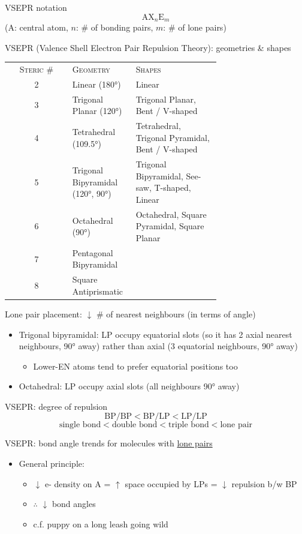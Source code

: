\documentclass[10pt,landscape]{article}
\newcommand{\extraline}{\vspace{1em}}
\newcommand{\tableindent}{\hspace{1.5em}}
\begin{document}
\begin{multicols}{3}
VSEPR notation
\[ \text{AX}_n\text{E}_m \]
\tableindent (A: central atom, $n$: \# of bonding pairs, $m$: \# of lone pairs) \\
\extraline


VSEPR (Valence Shell Electron Pair Repulsion Theory): geometries \& shapes

\begin{tabular}{@{\tableindent}cp{0.3\linewidth}<{\raggedright}p{0.4\linewidth}<{\raggedright}@{}}
\textsc{Steric \#} & \textsc{Geometry} & \textsc{Shapes} \\ 
2 & Linear (180°) 
	& Linear \\
3 & Trigonal Planar (120°)
	& Trigonal Planar, Bent / V-shaped \\
4 & Tetrahedral (109.5°)
	& Tetrahedral, Trigonal Pyramidal, Bent / V-shaped  \\
5 & Trigonal Bipyramidal (120°, 90°)
	& Trigonal Bipyramidal, See-saw, T-shaped, Linear  \\
6 & Octahedral (90°)
	& Octahedral, Square Pyramidal, Square Planar \\
7 & Pentagonal Bipyramidal & \\ %
8 & Square Antiprismatic & \\ %
\end{tabular}
\extraline

Lone pair placement:  $\downarrow$ \# of nearest neighbours (in terms of angle)
\begin{itemize}
	\item Trigonal bipyramidal: LP occupy equatorial slots (so it has 2 axial nearest neighbours, 90° away) rather than axial (3 equatorial neighbours, 90° away)
	\begin{itemize}	
		\item Lower-EN atoms tend to prefer equatorial positions too
	\end{itemize}
	\item Octahedral: LP occupy axial slots (all neighbours 90° away)
\end{itemize}


VSEPR: degree of repulsion
\[ \text{BP/BP} < \text{BP/LP} < \text{LP/LP} \]
\[ \text{single bond} < \text{double bond} < \text{triple bond} < \text{lone pair} \]

VSEPR: bond angle trends for molecules with \underline{lone pairs}
\begin{itemize}
\item General principle: 
	\begin{itemize}
		\item  $\downarrow$ e- density on A = $\uparrow$ space occupied by LPs = $\downarrow$ repulsion b/w BP 
		\item $\therefore$ $\downarrow$ bond angles
		\item c.f. puppy on a long leash going wild
	\end{itemize}


\end{itemize}
\end{multicols}
\end{document}
